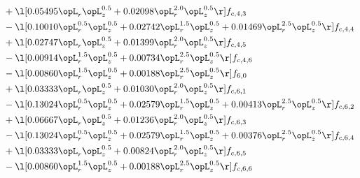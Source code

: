 \begin{alignat}{2}
& + \l[  0.05495 \opL_r \opL_z^{0.5} +  0.02098 \opL_r^{2.0} \opL_z^{0.5}  \r] f_{c,4,3} \nonumber \\ 
& - \l[  0.10010 \opL_r^{0.5} \opL_z^{0.5} +  0.02742 \opL_r^{1.5} \opL_z^{0.5} +  0.01469 \opL_r^{2.5} \opL_z^{0.5}  \r] f_{c,4,4} \nonumber \\ 
& + \l[  0.02747 \opL_r \opL_z^{0.5} +  0.01399 \opL_r^{2.0} \opL_z^{0.5}  \r] f_{c,4,5} \nonumber \\ 
& - \l[  0.00914 \opL_r^{1.5} \opL_z^{0.5} +  0.00734 \opL_r^{2.5} \opL_z^{0.5}  \r] f_{c,4,6} \nonumber \\ 
& - \l[  0.00860 \opL_r^{1.5} \opL_z^{0.5} +  0.00188 \opL_r^{2.5} \opL_z^{0.5}  \r] f_{6,0} \nonumber \\ 
& + \l[  0.03333 \opL_r \opL_z^{0.5} +  0.01030 \opL_r^{2.0} \opL_z^{0.5}  \r] f_{c,6,1} \nonumber \\ 
& - \l[  0.13024 \opL_r^{0.5} \opL_z^{0.5} +  0.02579 \opL_r^{1.5} \opL_z^{0.5} +  0.00413 \opL_r^{2.5} \opL_z^{0.5}  \r] f_{c,6,2} \nonumber \\ 
& + \l[  0.06667 \opL_r \opL_z^{0.5} +  0.01236 \opL_r^{2.0} \opL_z^{0.5}  \r] f_{c,6,3} \nonumber \\ 
& - \l[  0.13024 \opL_r^{0.5} \opL_z^{0.5} +  0.02579 \opL_r^{1.5} \opL_z^{0.5} +  0.00376 \opL_r^{2.5} \opL_z^{0.5}  \r] f_{c,6,4} \nonumber \\ 
& + \l[  0.03333 \opL_r \opL_z^{0.5} +  0.00824 \opL_r^{2.0} \opL_z^{0.5}  \r] f_{c,6,5} \nonumber \\ 
& - \l[  0.00860 \opL_r^{1.5} \opL_z^{0.5} +  0.00188 \opL_r^{2.5} \opL_z^{0.5}  \r] f_{c,6,6} \nonumber \\ 
\end{alignat} 


